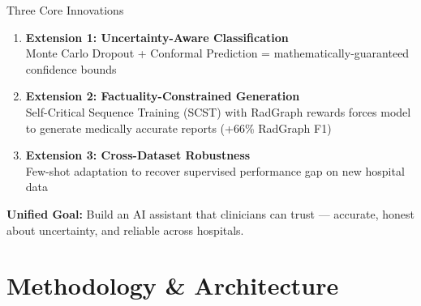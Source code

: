 \documentclass[aspectratio=169]{beamer}
\begin{document}
\begin{frame}{Three Core Innovations}
  
  \begin{enumerate}
    \setlength{\itemsep}{0.8cm}
    \item \textbf{\textcolor{medgreen}{Extension 1: Uncertainty-Aware Classification}}\\
      Monte Carlo Dropout + Conformal Prediction = mathematically-guaranteed confidence bounds
      
    \item \textbf{\textcolor{medgreen}{Extension 2: Factuality-Constrained Generation}}\\
      Self-Critical Sequence Training (SCST) with RadGraph rewards forces model to generate medically accurate reports (+66\% RadGraph F1)
      
    \item \textbf{\textcolor{medgreen}{Extension 3: Cross-Dataset Robustness}}\\
      Few-shot adaptation to recover supervised performance gap on new hospital data
  \end{enumerate}
  
  \vspace{0.5cm}
  
  \textbf{Unified Goal:} Build an AI assistant that clinicians can trust — accurate, honest about uncertainty, and reliable across hospitals.
  
\end{frame}

\section{Methodology \& Architecture}
\end{document}
